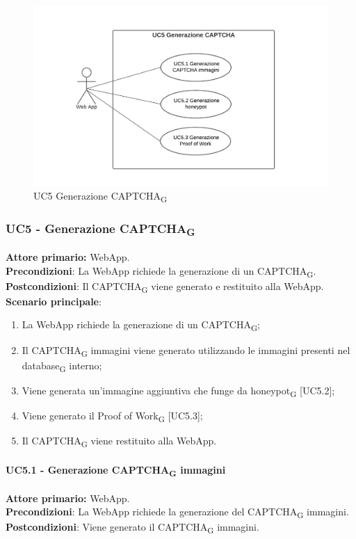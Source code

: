 \begin{figure}[H]
    \centering
    \includegraphics[scale=0.6]{img/generazione.png}
    \caption{UC5 Generazione CAPTCHA\textsubscript{G}}
\end{figure}

\subsubsection{UC5 - Generazione CAPTCHA\textsubscript{G}}
\textbf{Attore primario:} WebApp.\\
\textbf{Precondizioni}: La WebApp richiede la generazione di un CAPTCHA\textsubscript{G}.\\
\textbf{Postcondizioni}: Il CAPTCHA\textsubscript{G} viene generato e restituito alla WebApp.\\

\textbf{Scenario principale}:
\begin{enumerate}
    \item La WebApp richiede la generazione di un CAPTCHA\textsubscript{G};
    \item Il CAPTCHA\textsubscript{G} immagini viene generato utilizzando le immagini presenti nel database\textsubscript{G} interno;
    \item Viene generata un'immagine aggiuntiva che funge da honeypot\textsubscript{G} [UC5.2];
    \item Viene generato il Proof of Work\textsubscript{G} [UC5.3];
    \item Il CAPTCHA\textsubscript{G} viene restituito alla WebApp.
\end{enumerate}

\paragraph{UC5.1  - Generazione CAPTCHA\textsubscript{G} immagini}
\textbf{Attore primario:} WebApp.\\
\textbf{Precondizioni}: La WebApp richiede la generazione del CAPTCHA\textsubscript{G} immagini.\\
\textbf{Postcondizioni}: Viene generato il CAPTCHA\textsubscript{G} immagini.\\

